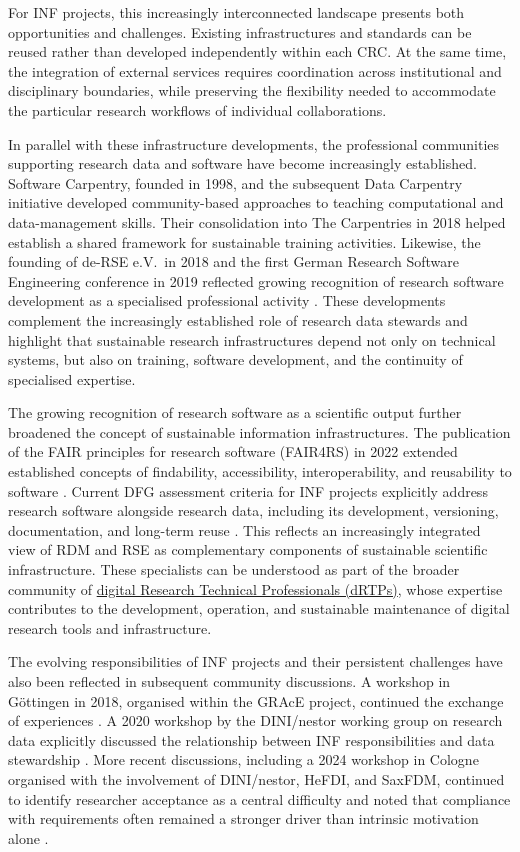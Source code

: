 \documentclass{eceasst}
\begin{document}
For INF projects, this increasingly interconnected
landscape presents both opportunities and challenges.
Existing infrastructures and standards can be reused
rather than developed independently within each CRC.
At the same time, the integration of external
services requires coordination across institutional
and disciplinary boundaries, while preserving the
flexibility needed to accommodate the particular
research workflows of individual collaborations.

In parallel with these infrastructure developments,
the professional communities supporting research data
and software have become increasingly established.
Software Carpentry, founded in 1998, and the subsequent
Data Carpentry initiative developed community-based
approaches to teaching computational and data-management
skills. Their consolidation into The Carpentries in
2018 helped establish a shared framework for
sustainable training activities.
Likewise, the founding of de-RSE e.V.\ in 2018 and
the first German Research Software Engineering conference
in 2019 reflected growing recognition of research
software development as a specialised professional
activity \cite{CarpentriesHistory,deRSE2018,Anzt:2020}.
These developments complement the increasingly
established role of research data stewards and
highlight that sustainable research infrastructures
depend not only on technical systems, but also on
training, software development, and the continuity
of specialised expertise.

The growing recognition of research software as
a scientific output further broadened the concept
of sustainable information infrastructures.
The publication of the FAIR principles for
research software (FAIR4RS) in 2022 extended
established concepts of findability,
accessibility, interoperability, and reusability
to software \cite{Barker2022FAIR4RS}.
Current DFG assessment criteria for INF projects
explicitly address research software alongside
research data, including its development,
versioning, documentation, and long-term reuse
\cite{DFG2025INF}.
This reflects an increasingly integrated view
of RDM and RSE as complementary components of
sustainable scientific infrastructure.
These specialists can be understood as part of the
broader community of \href{https://drtp-skills.ac.uk/}{digital Research Technical Professionals (dRTPs)}, whose expertise contributes
to the development, operation, and sustainable
maintenance of digital research tools and
infrastructure.

The evolving responsibilities of INF projects and
their persistent challenges have also been reflected
in subsequent community discussions.
A workshop in Göttingen in 2018, organised within
the GRAcE project, continued the exchange of
experiences \cite{Roertgen2019}.
A 2020 workshop by the DINI/nestor working group
on research data explicitly discussed the
relationship between INF responsibilities and
data stewardship \cite{Rizzolli_2021}.
More recent discussions, including a 2024 workshop in
Cologne organised with the involvement of DINI/nestor,
HeFDI, and SaxFDM, continued to identify researcher
acceptance as a central difficulty and noted that compliance with requirements often remained a stronger driver than intrinsic motivation alone \cite{bastian_2025}.
\end{document}
